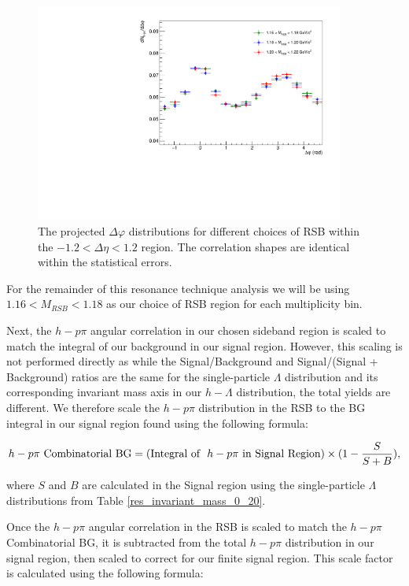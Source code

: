\documentclass[ALICE,manyauthors]{ALICE_analysis_notes}
\begin{document}
\begin{figure}[ht]
\centering
\includegraphics[width=4in]{figures/h_lambda_dphi_rsbcomp_0_20.pdf}
\caption{The projected $\Delta\varphi$ distributions for different choices of RSB within the $-1.2 < \Delta\eta < 1.2$ region. The correlation shapes are identical within the statistical errors.}
\label{normRSBcomp}
\end{figure}

For the remainder of this resonance technique analysis we will be using $1.16 < M_{RSB} < 1.18$ as our choice of RSB region for each multiplicity bin. 

Next, the $h-p\pi$ angular correlation in our chosen sideband region is scaled to match the integral of our background in our signal region. However, this scaling is not performed directly as while the Signal/Background and Signal/(Signal + Background) ratios are the same for the single-particle $\Lambda$ distribution and its corresponding invariant mass axis in our $h-\Lambda$ distribution, the total yields are different. We therefore scale the $h-p\pi$ distribution in the RSB to the BG integral in our signal region found using the following formula:

\begin{align}
	h-p\pi \text{\space Combinatorial BG} = (\text{Integral of \space} h-p\pi \text{\space in Signal Region}) \times (1 - \frac{S}{S+B}),
\end{align}

where $S$ and $B$ are calculated in the Signal region using the single-particle $\Lambda$ distributions from Table \ref{res_invariant_mass_0_20}.

Once the $h-p\pi$ angular correlation in the RSB is scaled to match the $h-p\pi$ Combinatorial BG, it is subtracted from the total $h-p\pi$ distribution in our signal region, then scaled to correct for our finite signal region. This scale factor is calculated using the following formula:
\end{document}

